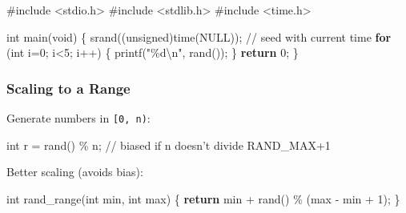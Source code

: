 \documentclass[
  letterpaper,
  DIV=11,
  numbers=noendperiod]{scrreprt}
\newenvironment{Shaded}{\begin{snugshade}}{\end{snugshade}}
\newcommand{\CommentTok}[1]{\textcolor[rgb]{0.37,0.37,0.37}{#1}}
\newcommand{\ControlFlowTok}[1]{\textcolor[rgb]{0.00,0.23,0.31}{\textbf{#1}}}
\newcommand{\DataTypeTok}[1]{\textcolor[rgb]{0.68,0.00,0.00}{#1}}
\newcommand{\DecValTok}[1]{\textcolor[rgb]{0.68,0.00,0.00}{#1}}
\newcommand{\ImportTok}[1]{\textcolor[rgb]{0.00,0.46,0.62}{#1}}
\newcommand{\NormalTok}[1]{\textcolor[rgb]{0.00,0.23,0.31}{#1}}
\newcommand{\OperatorTok}[1]{\textcolor[rgb]{0.37,0.37,0.37}{#1}}
\newcommand{\PreprocessorTok}[1]{\textcolor[rgb]{0.68,0.00,0.00}{#1}}
\newcommand{\SpecialCharTok}[1]{\textcolor[rgb]{0.37,0.37,0.37}{#1}}
\newcommand{\StringTok}[1]{\textcolor[rgb]{0.13,0.47,0.30}{#1}}
\begin{document}
\begin{Shaded}
\begin{Highlighting}[]
\PreprocessorTok{\#include }\ImportTok{\textless{}stdio.h\textgreater{}}
\PreprocessorTok{\#include }\ImportTok{\textless{}stdlib.h\textgreater{}}
\PreprocessorTok{\#include }\ImportTok{\textless{}time.h\textgreater{}}

\DataTypeTok{int}\NormalTok{ main}\OperatorTok{(}\DataTypeTok{void}\OperatorTok{)} \OperatorTok{\{}
\NormalTok{    srand}\OperatorTok{((}\DataTypeTok{unsigned}\OperatorTok{)}\NormalTok{time}\OperatorTok{(}\NormalTok{NULL}\OperatorTok{));}  \CommentTok{// seed with current time}
    \ControlFlowTok{for} \OperatorTok{(}\DataTypeTok{int}\NormalTok{ i}\OperatorTok{=}\DecValTok{0}\OperatorTok{;}\NormalTok{ i}\OperatorTok{\textless{}}\DecValTok{5}\OperatorTok{;}\NormalTok{ i}\OperatorTok{++)} \OperatorTok{\{}
\NormalTok{        printf}\OperatorTok{(}\StringTok{"}\SpecialCharTok{\%d\textbackslash{}n}\StringTok{"}\OperatorTok{,}\NormalTok{ rand}\OperatorTok{());}
    \OperatorTok{\}}
    \ControlFlowTok{return} \DecValTok{0}\OperatorTok{;}
\OperatorTok{\}}
\end{Highlighting}
\end{Shaded}

\subsubsection{Scaling to a Range}\label{scaling-to-a-range}

Generate numbers in \texttt{{[}0,\ n)}:

\begin{Shaded}
\begin{Highlighting}[]
\DataTypeTok{int}\NormalTok{ r }\OperatorTok{=}\NormalTok{ rand}\OperatorTok{()} \OperatorTok{\%}\NormalTok{ n}\OperatorTok{;}   \CommentTok{// biased if n doesn’t divide RAND\_MAX+1}
\end{Highlighting}
\end{Shaded}

Better scaling (avoids bias):

\begin{Shaded}
\begin{Highlighting}[]
\DataTypeTok{int}\NormalTok{ rand\_range}\OperatorTok{(}\DataTypeTok{int}\NormalTok{ min}\OperatorTok{,} \DataTypeTok{int}\NormalTok{ max}\OperatorTok{)} \OperatorTok{\{}
    \ControlFlowTok{return}\NormalTok{ min }\OperatorTok{+}\NormalTok{ rand}\OperatorTok{()} \OperatorTok{\%} \OperatorTok{(}\NormalTok{max }\OperatorTok{{-}}\NormalTok{ min }\OperatorTok{+} \DecValTok{1}\OperatorTok{);}
\OperatorTok{\}}
\end{Highlighting}
\end{Shaded}
\end{document}
